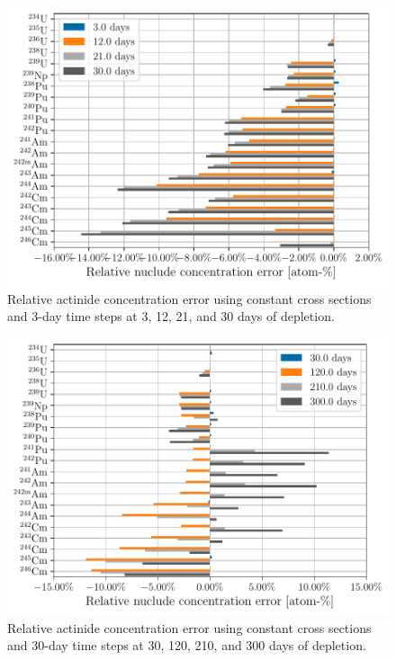     \begin{figure}[h!tpb]
        \centering
        \includegraphics[width=\linewidth]{figs/actinides_constant_xs_predictor_fission_q_days.pdf}
        \caption[]{Relative actinide concentration error using constant cross
        sections and 3-day time steps at 3, 12, 21, and 30 days of depletion.}
        \label{fig:actinides-error-constant-xs-days}
    \end{figure}

    \begin{figure}[h!tpb]
        \centering
        \includegraphics[width=\linewidth]{figs/actinides_constant_xs_predictor_fission_q_months.pdf}
        \caption{Relative actinide concentration error using constant cross
        sections and 30-day time steps at 30, 120, 210, and 300 days of
        depletion.}
        \label{fig:actinides-error-constant-xs-months}
    \end{figure}


